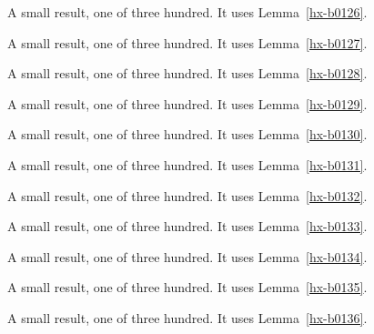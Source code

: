 \begin{lemma}[Bulk 127]\label{hx-b0127}
A small result, one of three hundred. It uses Lemma~\ref{hx-b0126}.
\end{lemma}

\begin{lemma}[Bulk 128]\label{hx-b0128}
A small result, one of three hundred. It uses Lemma~\ref{hx-b0127}.
\end{lemma}

\begin{lemma}[Bulk 129]\label{hx-b0129}
A small result, one of three hundred. It uses Lemma~\ref{hx-b0128}.
\end{lemma}

\begin{lemma}[Bulk 130]\label{hx-b0130}
A small result, one of three hundred. It uses Lemma~\ref{hx-b0129}.
\end{lemma}

\begin{lemma}[Bulk 131]\label{hx-b0131}
A small result, one of three hundred. It uses Lemma~\ref{hx-b0130}.
\end{lemma}

\begin{lemma}[Bulk 132]\label{hx-b0132}
A small result, one of three hundred. It uses Lemma~\ref{hx-b0131}.
\end{lemma}

\begin{lemma}[Bulk 133]\label{hx-b0133}
A small result, one of three hundred. It uses Lemma~\ref{hx-b0132}.
\end{lemma}

\begin{lemma}[Bulk 134]\label{hx-b0134}
A small result, one of three hundred. It uses Lemma~\ref{hx-b0133}.
\end{lemma}

\begin{lemma}[Bulk 135]\label{hx-b0135}
A small result, one of three hundred. It uses Lemma~\ref{hx-b0134}.
\end{lemma}

\begin{lemma}[Bulk 136]\label{hx-b0136}
A small result, one of three hundred. It uses Lemma~\ref{hx-b0135}.
\end{lemma}

\begin{lemma}[Bulk 137]\label{hx-b0137}
A small result, one of three hundred. It uses Lemma~\ref{hx-b0136}.
\end{lemma}

